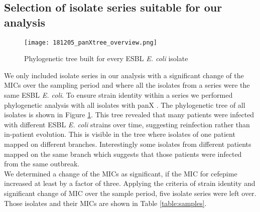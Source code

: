 \subsection{Selection of isolate series suitable for our analysis}
\begin{figure}
	\texttt{[image: 181205\_panXtree\_overview.png]}
	\caption{Phylogenetic tree built for every ESBL \textit{E. coli} isolate}
	\label{figure:panX}
\end{figure}
We only included isolate series in our analysis with a significant change of the MICs over the sampling period and where all the isolates from a series were the same ESBL \textit{E. coli}. To ensure strain identity within a series we performed phylogenetic analysis with all isolates with panX \cite{ding_panx:_2018}.    
The phylogenetic tree of all isolates is shown in Figure \ref{figure:panX}. This tree revealed that many patients were infected with different ESBL \textit{E. coli} strains over time, suggesting reinfection rather than in-patient evolution. This is visible in the tree where isolates of one patient mapped on different branches. Interestingly some isolates from different patients mapped on the same branch which suggests that those patients were infected from the same outbreak. \\
We determined a change of the MICs as significant, if the MIC for cefepime increased at least by a factor of three. Applying the criteria of strain identity and significant change of MIC over the sample period, five isolate series were left over. Those isolates and their MICs are shown in Table \ref{table:samples}.
